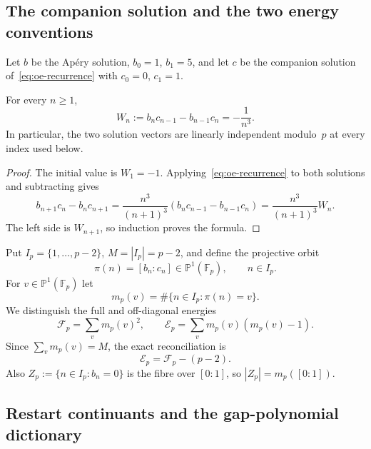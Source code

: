 \subsection{The companion solution and the two energy conventions}

Let $b$ be the Ap\'ery solution, $b_0=1$, $b_1=5$, and let $c$ be the
companion solution of~\eqref{eq:oe-recurrence} with $c_0=0$, $c_1=1$.

\begin{lemma}\label{lem:oe-casoratian}
For every $n\ge1$,
\[
 W_n:=b_nc_{n-1}-b_{n-1}c_n=-\frac1{n^3}.
\]
In particular, the two solution vectors are linearly independent modulo~$p$
at every index used below.
\end{lemma}

\begin{proof}
The initial value is $W_1=-1$.  Applying~\eqref{eq:oe-recurrence} to both
solutions and subtracting gives
\[
 b_{n+1}c_n-b_nc_{n+1}
 =\frac{n^3}{(n+1)^3}(b_nc_{n-1}-b_{n-1}c_n)
 =\frac{n^3}{(n+1)^3}W_n.
\]
The left side is $W_{n+1}$, so induction proves the formula.
\end{proof}

Put $I_p=\{1,\ldots,p-2\}$, $M=|I_p|=p-2$, and define the projective
orbit
\[
 \pi(n)=[b_n:c_n]\in\mathbb P^1(\mathbb F_p),\qquad n\in I_p.
\]
For $v\in\mathbb P^1(\mathbb F_p)$ let
\[
 m_p(v)=\#\{n\in I_p:\pi(n)=v\}.
\]
We distinguish the full and off-diagonal energies
\begin{equation}\label{eq:oe-energy-conventions}
 \mathcal F_p=\sum_v m_p(v)^2,
 \qquad
 \mathcal E_p=\sum_v m_p(v)(m_p(v)-1).
\end{equation}
Since $\sum_vm_p(v)=M$, the exact reconciliation is
\begin{equation}\label{eq:oe-energy-reconcile}
 \boxed{\mathcal E_p=\mathcal F_p-(p-2).}
\end{equation}
Also $Z_p:=\{n\in I_p:b_n=0\}$ is the fibre over $[0:1]$, so
$|Z_p|=m_p([0:1])$.

\subsection{Restart continuants and the gap-polynomial dictionary}


